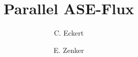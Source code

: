 \documentclass[3p]{elsarticle}
\begin{document}
\title{Parallel ASE-Flux}

\author[hzdr]{C. Eckert}

\author[hzdr]{E. Zenker}

\address[hzdr]{
  Institute of Radiation Physics, 
  Helmholtz-Zentrum Dresden-Rossendorf e. V.,
  Bautzner Landstraße 400,
  01328 Dresden,  
  Germany
}



\maketitle

\begin{multicols}{2}





		


\end{multicols}
\end{document}
